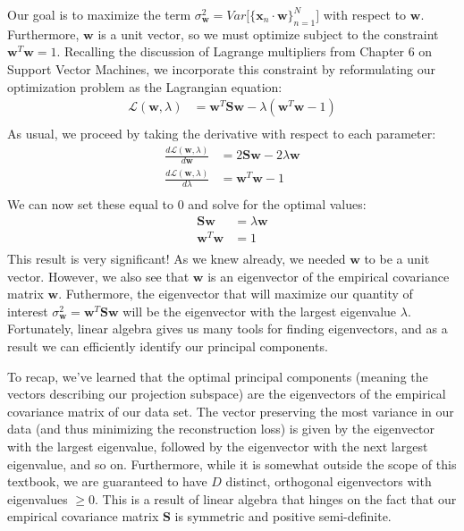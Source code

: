 Our goal is to maximize the term $\sigma^{2}_{\textbf{w}} = Var\big[\{\textbf{x}_{n} \cdot \textbf{w}\}_{n=1}^{N}\big]$ with respect to $\textbf{w}$. Furthermore, $\textbf{w}$ is a unit vector, so we must optimize subject to the constraint $\textbf{w}^{T}\textbf{w} = 1$. Recalling the discussion of Lagrange multipliers from Chapter 6 on Support Vector Machines, we incorporate this constraint by reformulating our optimization problem as the Lagrangian equation:
\begin{align*}
    \mathcal{L}(\textbf{w}, \lambda) &= \textbf{w}^{T} \textbf{S} \textbf{w} - \lambda(\textbf{w}^{T}\textbf{w} - 1) \\
\end{align*}
As usual, we proceed by taking the derivative with respect to each parameter:
\begin{align*}
    \frac{d\mathcal{L}(\textbf{w}, \lambda)}{d\textbf{w}} &= 2\textbf{S} \textbf{w} - 2\lambda\textbf{w} \\
    \frac{d\mathcal{L}(\textbf{w}, \lambda)}{d\lambda} &= \textbf{w}^{T}\textbf{w} - 1 \\
\end{align*}
We can now set these equal to 0 and solve for the optimal values:
\begin{align*}
    \textbf{S} \textbf{w} &= \lambda\textbf{w} \\
    \textbf{w}^{T}\textbf{w} &= 1 \\
\end{align*}
This result is very significant! As we knew already, we needed $\textbf{w}$ to be a unit vector. However, we also see that $\textbf{w}$ is an eigenvector of the empirical covariance matrix $\textbf{w}$. Futhermore, the eigenvector that will maximize our quantity of interest $\sigma^{2}_{\textbf{w}} = \textbf{w}^{T} \textbf{S} \textbf{w}$ will be the eigenvector with the largest eigenvalue $\lambda$. Fortunately, linear algebra gives us many tools for finding eigenvectors, and as a result we can efficiently identify our principal components.

To recap, we've learned that the optimal principal components (meaning the vectors describing our projection subspace) are the eigenvectors of the empirical covariance matrix of our data set. The vector preserving the most variance in our data (and thus minimizing the reconstruction loss) is given by the eigenvector with the largest eigenvalue, followed by the eigenvector with the next largest eigenvalue, and so on. Furthermore, while it is somewhat outside the scope of this textbook, we are guaranteed to have $D$ distinct, orthogonal eigenvectors with eigenvalues $\geq 0$. This is a result of linear algebra that hinges on the fact that our empirical covariance matrix $\textbf{S}$ is symmetric and positive semi-definite.

